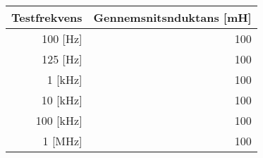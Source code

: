 \begin{tabular}{r|r}
Testfrekvens&Gennemsnitsnduktans [mH] \\\hline
100 [Hz]&100 \\
125 [Hz]&100 \\
1 [kHz]&100 \\
10 [kHz]&100 \\
100 [kHz]&100 \\
1 [MHz]&100 \\
\end{tabular}
